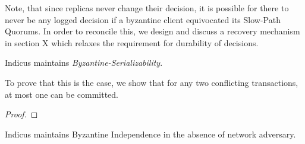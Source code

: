 Note, that since replicas never change their decision, it is possible for there to never be any logged decision if a byzantine client equivocated its Slow-Path Quorums. In order to reconcile this, we design and discuss a recovery mechanism in section X which relaxes the requirement for durability of decisions.  


\begin{theorem} 
Indicus maintains \textit{Byzantine-Serializability}.
\end{theorem}
To prove that this is the case, we show that for any two conflicting transactions, at most one can be committed.
\begin{proof}

\end{proof}

\begin{theorem} 
Indicus maintains Byzantine Independence in the absence of network adversary.
\end{theorem}

